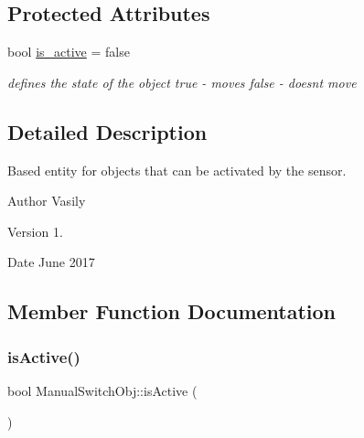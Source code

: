 \subsection*{Protected Attributes}
\begin{DoxyCompactItemize}
\item 
\mbox{\label{class_manual_switch_obj_aa1d16c8a1740f4dc3152470088154f97}} 
bool \hyperlink{class_manual_switch_obj_aa1d16c8a1740f4dc3152470088154f97}{is\+\_\+active} = false
\begin{DoxyCompactList}\small\item\em defines the state of the object \textquotesingle{}true\textquotesingle{} -\/ moves \textquotesingle{}false\textquotesingle{} -\/ doesn\textquotesingle{}t move \end{DoxyCompactList}\end{DoxyCompactItemize}


\subsection{Detailed Description}
Based entity for objects that can be activated by the sensor. 

\begin{DoxyAuthor}{Author}
Vasily 
\end{DoxyAuthor}
\begin{DoxyVersion}{Version}
1. 
\end{DoxyVersion}
\begin{DoxyDate}{Date}
June 2017 
\end{DoxyDate}


\subsection{Member Function Documentation}
\mbox{\label{class_manual_switch_obj_a4d6cc0a3de424ab6bf4665eeb0f639af}} 
\subsubsection{\texorpdfstring{is\+Active()}{isActive()}}
{\footnotesize\ttfamily bool Manual\+Switch\+Obj\+::is\+Active (\begin{DoxyParamCaption}{ }\end{DoxyParamCaption})\hspace{0.3cm}{\ttfamily [virtual]}}



